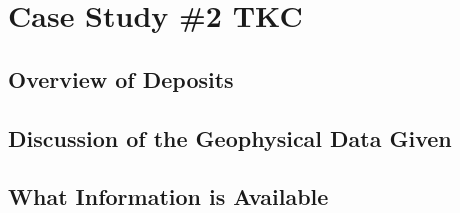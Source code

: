 
\chapter{Case Study \#2 TKC}
\label{ch:CaseStudy2}




\section{Overview of Deposits}
\label{sec:Overview of Deposits:TKC}
%
%
\section{Discussion of the Geophysical Data Given}
\label{sec:Discussion of the Geophysical Data Given:TKC}
%
%

\section{What Information is Available}
\label{sec:What Information is Available:TKC}

%
%

